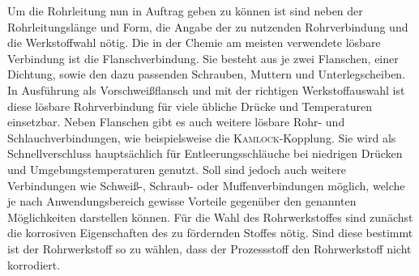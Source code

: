 Um die Rohrleitung nun in Auftrag geben zu können ist sind neben der Rohrleitungslänge und Form, die Angabe der zu nutzenden Rohrverbindung und die Werkstoffwahl nötig. Die in der Chemie am meisten verwendete lösbare Verbindung ist die Flanschverbindung. Sie besteht aus je zwei Flanschen, einer Dichtung, sowie den dazu passenden Schrauben, Muttern und Unterlegscheiben. In Ausführung als Vorschweißflansch und mit der richtigen Werkstoffauswahl ist diese lösbare Rohrverbindung für viele übliche Drücke und Temperaturen einsetzbar.  Neben Flanschen gibt es auch weitere lösbare Rohr- und Schlauchverbindungen, wie beispielsweise die \textsc{Kamlock}-Kopplung. Sie wird als Schnellverschluss hauptsächlich für Entleerungsschläuche bei niedrigen Drücken und Umgebungstemperaturen genutzt. Soll sind jedoch auch weitere Verbindungen wie Schweiß-, Schraub- oder Muffenverbindungen möglich, welche je nach Anwendungsbereich gewisse Vorteile gegenüber den genannten Möglichkeiten darstellen können.\cite{Ignatowitz.2015}\linebreak
Für die Wahl des Rohrwerkstoffes sind zunächst die korrosiven Eigenschaften des zu fördernden Stoffes nötig. Sind diese bestimmt ist der Rohrwerkstoff so zu wählen, dass der Prozessstoff den Rohrwerkstoff nicht korrodiert.




%
%
%
%
%
